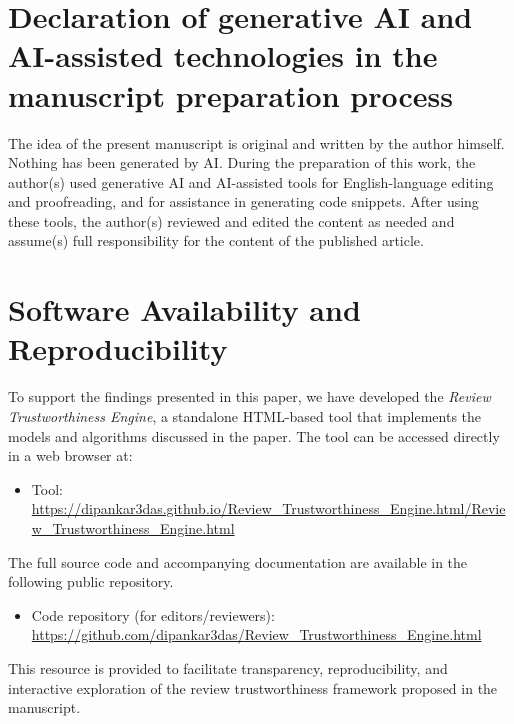 \documentclass[conference]{IEEEtran}
\theoremstyle{plain}
\theoremstyle{definition}
\theoremstyle{remark}
\begin{document}
	\section*{Declaration of generative AI and AI-assisted technologies in the manuscript preparation  process}
	The idea of the present manuscript is original and written by the author himself. Nothing has been generated by AI. During the preparation of this work, the author(s) used generative AI and AI-assisted tools for English-language editing and proofreading, and for assistance in generating code snippets. After using these tools, the author(s) reviewed and edited the content as needed and assume(s) full responsibility for the content of the published article.
	\section*{Software Availability and Reproducibility}
	To support the findings presented in this paper, we have developed the \textit{Review Trustworthiness Engine}, a standalone HTML-based tool that implements the models and algorithms discussed in the paper. The tool can be accessed directly in a web browser at:
	\begin{itemize}
		\item Tool: \url{https://dipankar3das.github.io/Review_Trustworthiness_Engine.html/Review_Trustworthiness_Engine.html}
	\end{itemize}
	The full source code and accompanying documentation are available in the following public repository.
	\begin{itemize}
		\item Code repository (for editors/reviewers): \url{https://github.com/dipankar3das/Review_Trustworthiness_Engine.html}
	\end{itemize}
	This resource is provided to facilitate transparency, reproducibility, and interactive exploration of the review trustworthiness framework proposed in the manuscript.

	\begingroup
	\setlength{\bibsep}{0pt}  %
	
	
	\endgroup
	
	
	
	
\end{document}
